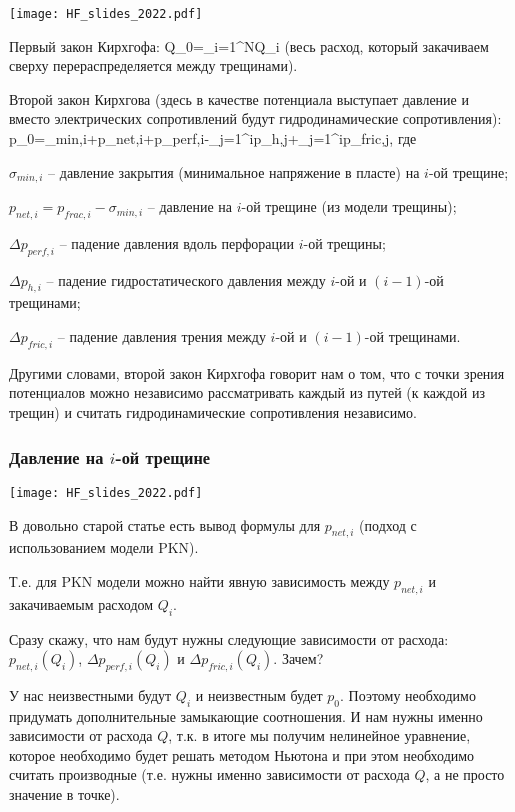 \documentclass[main.tex]{subfiles}
\begin{document}
\texttt{[image: HF\_slides\_2022.pdf]}

Первый закон Кирхгофа:
\beq
Q_0=\sum_{i=1}^{N}{Q_i}
\eeq
(весь расход, который закачиваем сверху перераспределяется между трещинами).

Второй закон Кирхгова (здесь в качестве потенциала выступает давление и вместо электрических сопротивлений будут гидродинамические сопротивления):
\beq
p_0=\sigma_{min,i}+p_{net,i}+\Delta p_{perf,i}-\sum_{j=1}^{i}{\Delta p_{h,j}}+\sum_{j=1}^{i}\Delta p_{fric,j},
\eeq
где

$\sigma_{min,i}$ -- давление закрытия (минимальное напряжение в пласте) на $i$-ой трещине;

$p_{net,i}=p_{frac,i}-\sigma_{min,i}$ -- давление на $i$-ой трещине (из модели трещины);

$\Delta p_{perf,i}$ -- падение давления вдоль перфорации $i$-ой трещины;

$\Delta p_{h,i}$ -- падение гидростатического давления между $i$-ой и $(i-1)$-ой трещинами;

$\Delta p_{fric,i}$ -- падение давления трения между $i$-ой и $(i-1)$-ой трещинами.

Другими словами, второй закон Кирхгофа говорит нам о том, что с точки зрения потенциалов можно независимо рассматривать каждый из путей (к каждой из трещин) и считать гидродинамические сопротивления независимо.

\subsubsection{Давление на $i$-ой трещине}

\texttt{[image: HF\_slides\_2022.pdf]}

В довольно старой статье есть вывод формулы для $p_{net,i}$ (подход с использованием модели PKN).

Т.е. для PKN модели можно найти явную зависимость между $p_{net,i}$ и закачиваемым расходом $Q_i$.

Сразу скажу, что нам будут нужны следующие зависимости от расхода: $p_{net,i}(Q_i)$, $\Delta p_{perf,i}(Q_i)$ и $\Delta p_{fric,i}(Q_i)$.
Зачем?

У нас неизвестными будут $Q_i$ и неизвестным будет $p_0$.
Поэтому необходимо придумать дополнительные замыкающие соотношения.
И нам нужны именно зависимости от расхода $Q$, т.к. в итоге мы получим нелинейное уравнение, которое необходимо будет решать методом Ньютона и при этом необходимо считать производные (т.е. нужны именно зависимости от расхода $Q$, а не просто значение в точке).
\end{document}
